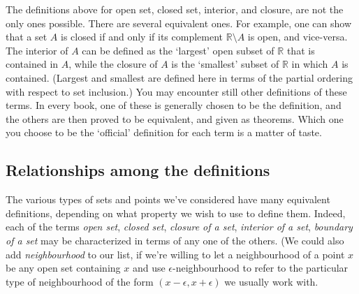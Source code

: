 \documentclass[12pt,letterpaper]{article}
\newcommand{\R}{\mathbb{R}}
\begin{document}
The definitions above for open set, closed set, interior, and closure, are not the only ones possible. There are several equivalent ones. For example, one can show that a set $A$ is closed if and only if its complement $\R\setminus A$ is open, and vice-versa. The interior of $A$ can be defined as the `largest' open subset of $\R$ that is contained in $A$, while the closure of $A$ is the `smallest' subset of $\R$ in which $A$ is contained. (Largest and smallest are defined here in terms of the partial ordering with respect to set inclusion.) You may encounter still other definitions of these terms. In every book, one of these is generally chosen to be the definition, and the others are then proved to be equivalent, and given as theorems. Which one you choose to be the `official' definition for each term is a matter of taste.

\subsection*{Relationships among the definitions}
The various types of sets and points we've considered have many equivalent definitions, depending on what property we wish to use to define them. Indeed, each of the terms {\em open set}, {\em closed set}, {\em closure of a set}, {\em interior of a set}, {\em boundary of a set} may be characterized in terms of any one of the others. (We could also add {\em neighbourhood} to our list, if we're willing to let a neighbourhood of a point $x$ be any open set containing $x$ and use $\epsilon$-neighbourhood to refer to the particular type of neighbourhood of the form $(x-\epsilon, x+\epsilon)$ we usually work with.
\end{document}
